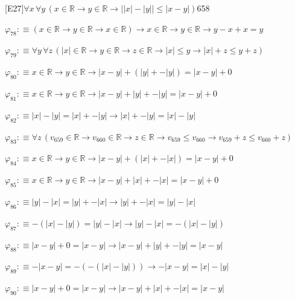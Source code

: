 \begin{fullproof}{[E27]}{$\forall x\,\forall y\,(x \in \mathbb{R} \to y \in \mathbb{R} \to \lvert \lvert x \rvert - \lvert y \rvert \rvert \leq \lvert x - y \rvert)$}{658}
\begin{abbrevlist}
\item $\varphi_{78} :\equiv (x \in \mathbb{R} \to y \in \mathbb{R} \to x \in \mathbb{R}) \to x \in \mathbb{R} \to y \in \mathbb{R} \to y - x + x = y$
\item $\varphi_{79} :\equiv \forall y\,\forall z\,(\lvert x \rvert \in \mathbb{R} \to y \in \mathbb{R} \to z \in \mathbb{R} \to \lvert x \rvert \leq y \to \lvert x \rvert + z \leq y + z)$
\item $\varphi_{80} :\equiv x \in \mathbb{R} \to y \in \mathbb{R} \to \lvert x - y \rvert + (\lvert y \rvert + -\lvert y \rvert) = \lvert x - y \rvert + 0$
\item $\varphi_{81} :\equiv x \in \mathbb{R} \to y \in \mathbb{R} \to \lvert x - y \rvert + \lvert y \rvert + -\lvert y \rvert = \lvert x - y \rvert + 0$
\item $\varphi_{82} :\equiv \lvert x \rvert - \lvert y \rvert = \lvert x \rvert + -\lvert y \rvert \to \lvert x \rvert + -\lvert y \rvert = \lvert x \rvert - \lvert y \rvert$
\item $\varphi_{83} :\equiv \forall z\,(v_{659} \in \mathbb{R} \to v_{660} \in \mathbb{R} \to z \in \mathbb{R} \to v_{659} \leq v_{660} \to v_{659} + z \leq v_{660} + z)$
\item $\varphi_{84} :\equiv x \in \mathbb{R} \to y \in \mathbb{R} \to \lvert x - y \rvert + (\lvert x \rvert + -\lvert x \rvert) = \lvert x - y \rvert + 0$
\item $\varphi_{85} :\equiv x \in \mathbb{R} \to y \in \mathbb{R} \to \lvert x - y \rvert + \lvert x \rvert + -\lvert x \rvert = \lvert x - y \rvert + 0$
\item $\varphi_{86} :\equiv \lvert y \rvert - \lvert x \rvert = \lvert y \rvert + -\lvert x \rvert \to \lvert y \rvert + -\lvert x \rvert = \lvert y \rvert - \lvert x \rvert$
\item $\varphi_{87} :\equiv -(\lvert x \rvert - \lvert y \rvert) = \lvert y \rvert - \lvert x \rvert \to \lvert y \rvert - \lvert x \rvert = -(\lvert x \rvert - \lvert y \rvert)$
\item $\varphi_{88} :\equiv \lvert x - y \rvert + 0 = \lvert x - y \rvert \to \lvert x - y \rvert + \lvert y \rvert + -\lvert y \rvert = \lvert x - y \rvert$
\item $\varphi_{89} :\equiv -\lvert x - y \rvert = -(-(\lvert x \rvert - \lvert y \rvert)) \to -\lvert x - y \rvert = \lvert x \rvert - \lvert y \rvert$
\item $\varphi_{90} :\equiv \lvert x - y \rvert + 0 = \lvert x - y \rvert \to \lvert x - y \rvert + \lvert x \rvert + -\lvert x \rvert = \lvert x - y \rvert$

\end{abbrevlist}
\end{fullproof}
